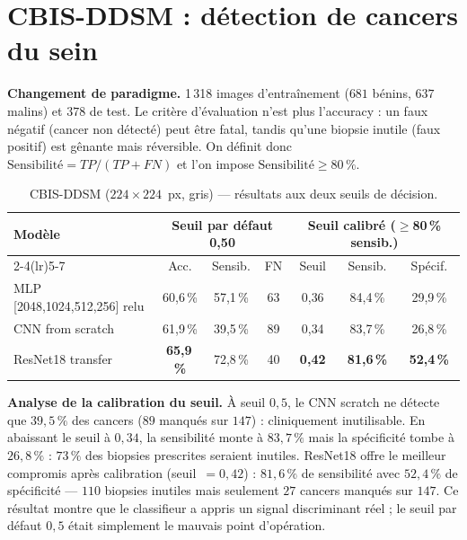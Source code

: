 \documentclass[10pt, a4paper]{article}
\begin{document}
\section{CBIS-DDSM : détection de cancers du sein}

\textbf{Changement de paradigme.}
1\,318 images d'entraînement ($681$ bénins, $637$ malins) et $378$ de test.
Le critère d'évaluation n'est plus l'accuracy : un faux négatif (cancer non détecté)
peut être fatal, tandis qu'une biopsie inutile (faux positif) est gênante mais réversible.
On définit donc $\text{Sensibilité} = TP/(TP+FN)$ et l'on impose
$\text{Sensibilité} \geq 80\,\%$.

\begin{table}[H]
\centering
\caption{CBIS-DDSM ($224{\times}224$~px, gris) — résultats aux deux seuils de décision.}
\label{tab:ddsm}
\begin{tabular}{lcccccc}
\toprule
\multirow{2}{*}{\textbf{Modèle}} &
\multicolumn{3}{c}{\textbf{Seuil par défaut 0,50}} &
\multicolumn{3}{c}{\textbf{Seuil calibré ($\geq$80\,\% sensib.)}} \\
\cmidrule(lr){2-4}\cmidrule(lr){5-7}
& Acc. & Sensib. & FN &  Seuil & Sensib. & Spécif. \\
\midrule
MLP [2048,1024,512,256] relu
  & 60{,}6\,\% & 57{,}1\,\% & 63
  & 0{,}36 & 84{,}4\,\% & 29{,}9\,\% \\
CNN from scratch
  & 61{,}9\,\% & 39{,}5\,\% & 89
  & 0{,}34 & 83{,}7\,\% & 26{,}8\,\% \\
ResNet18 transfer
  & \textbf{65{,}9\,\%} & 72{,}8\,\% & 40
  & \textbf{0{,}42} & \textbf{81{,}6\,\%} & \textbf{52{,}4\,\%} \\
\bottomrule
\end{tabular}
\end{table}

\textbf{Analyse de la calibration du seuil.}
À seuil $0{,}5$, le CNN scratch ne détecte que $39{,}5\,\%$ des cancers
($89$ manqués sur $147$) : cliniquement inutilisable.
En abaissant le seuil à $0{,}34$, la sensibilité monte à $83{,}7\,\%$
mais la spécificité tombe à $26{,}8\,\%$ : $73\,\%$ des biopsies prescrites seraient
inutiles.
ResNet18 offre le meilleur compromis après calibration (seuil~$=0{,}42$) :
$81{,}6\,\%$ de sensibilité avec $52{,}4\,\%$ de spécificité —
$110$ biopsies inutiles mais seulement $27$ cancers manqués sur $147$.
Ce résultat montre que le classifieur a appris un signal discriminant réel ;
le seuil par défaut $0{,}5$ était simplement le mauvais point d'opération.
\end{document}
